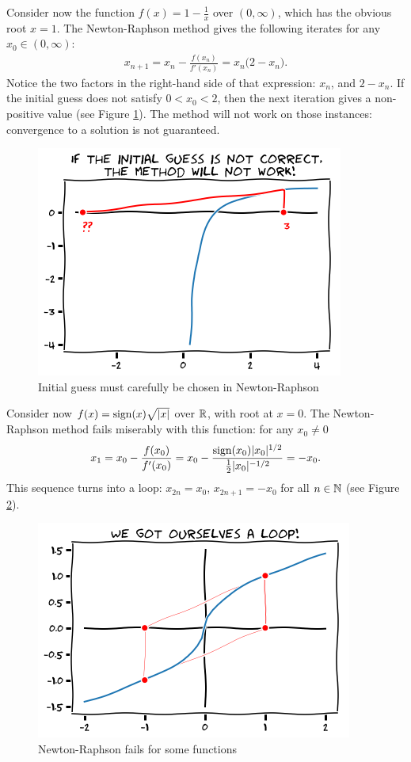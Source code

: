 \begin{example}\label{example:NewtonRaphsonChoice}
Consider now the function $f(x) = 1-\tfrac{1}{x}$ over $(0, \infty)$, which has the obvious root $x=1$. The Newton-Raphson method gives the following iterates for any $x_0 \in (0,\infty)$:
\begin{align*}
x_{n+1} = x_n - \frac{f(x_n)}{f'(x_n)} = x_n \big( 2- x_n \big).
\end{align*}
Notice the two factors in the right-hand side of that expression: $x_n$, and $2-x_n$.  If the initial guess does not satisfy $0<x_0<2$, then the next iteration gives a non-positive value (see Figure \ref{figure:NewtonRaphsonChoice}).  The method will not work on those instances: convergence to a solution is not guaranteed.
\begin{figure}[ht!]
\includegraphics[width=0.55\linewidth]{images/badNewton.png}
\caption{Initial guess must carefully be chosen in Newton-Raphson}
\label{figure:NewtonRaphsonChoice}
\end{figure}
\end{example}

\begin{example}\label{example:NewtonRaphsonloop}
Consider now $f(x) = \operatorname{sign}(x)\sqrt{\lvert x \rvert}$ over $\mathbb{R}$, with root at $x=0$.  The Newton-Raphson method fails miserably with this function: for any $x_0 \neq 0$
\begin{align*}
x_1 = x_0 - \frac{f(x_0)}{f'(x_0)} = x_0 - \frac{\operatorname{sign}(x_0)\lvert x_0 \rvert^{1/2}}{\tfrac{1}{2}\lvert x_0 \rvert^{-1/2}} = -x_0.
\end{align*}
This sequence turns into a loop: $x_{2n}=x_0$, $x_{2n+1}=-x_0$ for all $n\in \mathbb{N}$ (see Figure \ref{figure:NewtonRaphsonloop}).
\begin{figure}[ht!]
\includegraphics[width=0.55\linewidth]{images/loop.png}
\caption{Newton-Raphson fails for some functions}
\label{figure:NewtonRaphsonloop}
\end{figure}
\end{example}

